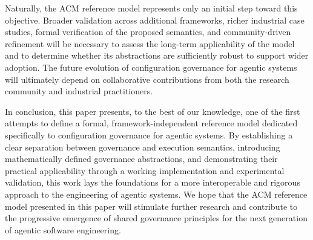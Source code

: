 \documentclass[10pt]{article}
\begin{document}
Naturally, the ACM reference model represents only an initial step toward this objective. Broader validation across additional frameworks, richer industrial case studies, formal verification of the proposed semantics, and community-driven refinement will be necessary to assess the long-term applicability of the model and to determine whether its abstractions are sufficiently robust to support wider adoption. The future evolution of configuration governance for agentic systems will ultimately depend on collaborative contributions from both the research community and industrial practitioners.

In conclusion, this paper presents, to the best of our knowledge, one of the first attempts to define a formal, framework-independent reference model dedicated specifically to configuration governance for agentic systems. By establishing a clear separation between governance and execution semantics, introducing mathematically defined governance abstractions, and demonstrating their practical applicability through a working implementation and experimental validation, this work lays the foundations for a more interoperable and rigorous approach to the engineering of agentic systems. We hope that the ACM reference model presented in this paper will stimulate further research and contribute to the progressive emergence of shared governance principles for the next generation of agentic software engineering.
\end{document}
